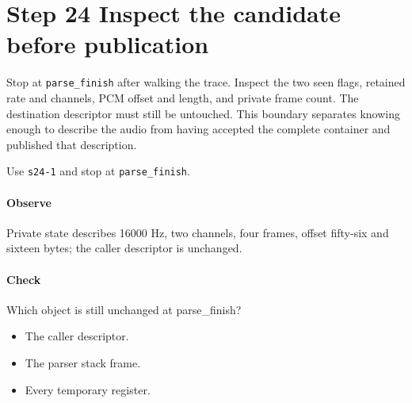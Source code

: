 \section{Step 24 Inspect the candidate before publication}\label{pcm-wav-s24}
Stop at \texttt{parse\_finish} after walking the trace. Inspect the two seen flags, retained rate and channels, PCM offset and length, and private frame count. The destination descriptor must still be untouched. This boundary separates knowing enough to describe the audio from having accepted the complete container and published that description.

Use \texttt{s24-1} and stop at \texttt{parse\_finish}.

\paragraph{Observe} Private state describes 16000 Hz, two channels, four frames, offset fifty-six and sixteen bytes; the caller descriptor is unchanged.

\paragraph{Check} Which object is still unchanged at parse\_finish?
\begin{itemize}
\item[A.] The caller descriptor.
\item[B.] The parser stack frame.
\item[C.] Every temporary register.
\end{itemize}
